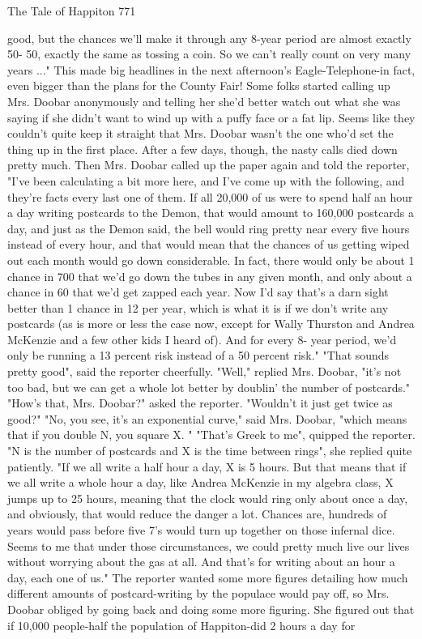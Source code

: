 The Tale of Happiton                                                                  771

good, but the chances we'll make it through any 8-year period are almost exactly 50-
50, exactly the same as tossing a coin. So we can't really count on very many years ..."
         This made big headlines in the next afternoon's Eagle-Telephone-in fact, even
bigger than the plans for the County Fair! Some folks started calling up Mrs. Doobar
anonymously and telling her she'd better watch out what she was saying if she didn't
want to wind up with a puffy face or a fat lip. Seems like they couldn't quite keep it
straight that Mrs. Doobar wasn't the one who'd set the thing up in the first place.
         After a few days, though, the nasty calls died down pretty much. Then Mrs.
Doobar called up the paper again and told the reporter, "I've been calculating a bit
more here, and I've come up with the following, and they're facts every last one of
them. If all 20,000 of us were to spend half an hour a day writing postcards to the
Demon, that would amount to 160,000 postcards a day, and just as the Demon said,
the bell would ring pretty near every five hours instead of every hour, and that would
mean that the chances of us getting wiped out each month would go down
considerable. In fact, there would only be about 1 chance in 700 that we'd go down
the tubes in any given month, and only about a chance in 60 that we'd get zapped each
year. Now I'd say that's a darn sight better than 1 chance in 12 per year, which is what
it is if we don't write any postcards (as is more or less the case now, except for Wally
Thurston and Andrea McKenzie and a few other kids I heard of). And for every 8-
year period, we'd only be running a 13 percent risk instead of a 50 percent risk."
         "That sounds pretty good", said the reporter cheerfully.
         "Well," replied Mrs. Doobar, "it's not too bad, but we can get a whole lot
better by doublin' the number of postcards."
         "How's that, Mrs. Doobar?" asked the reporter. "Wouldn't it just get twice as
good?"
         "No, you see, it's an exponential curve," said Mrs. Doobar, "which means that
if you double N, you square X. "
         "That's Greek to me", quipped the reporter.
         "N is the number of postcards and X is the time between rings", she replied
quite patiently. "If we all write a half hour a day, X is 5 hours. But that means that if
we all write a whole hour a day, like Andrea McKenzie in my algebra class, X jumps
up to 25 hours, meaning that the clock would ring only about once a day, and
obviously, that would reduce the danger a lot. Chances are, hundreds of years would
pass before five 7's would turn up together on those infernal dice. Seems to me that
under those circumstances, we could pretty much live our lives without worrying
about the gas at all. And that's for writing about an hour a day, each one of us."
         The reporter wanted some more figures detailing how much different amounts
of postcard-writing by the populace would pay off, so Mrs. Doobar obliged by going
back and doing some more figuring. She figured out that if 10,000 people-half the
population of Happiton-did 2 hours a day for




